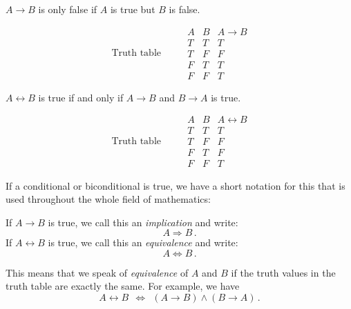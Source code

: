 

\begin{definition}
   $A \rightarrow B$ is only false if $A$ is true but $B$ is false.
\end{definition}
 
   \begin{equation}
   \mbox{ Truth table }\qquad 
    \begin{array}{cc|c}
     A & B & A \rightarrow B \\ \hline
     T & T& T\\
     T & F & F\\
     F & T & T\\
     F & F & T
    \end{array}
   \end{equation}


\begin{definition}
$A \leftrightarrow B$ is true if and only if $A \rightarrow B$ and $B \rightarrow A$ is true.
\end{definition}

   \begin{equation}
   \mbox{ Truth table }\qquad 
    \begin{array}{cc|c}
     A & B & A \leftrightarrow B \\ \hline
     T & T& T\\
     T & F & F\\
     F & T & F\\
     F & F & T
    \end{array}
   \end{equation}
   
If a conditional or biconditional is true,
we have a short notation for this that is used throughout   
the whole field of mathematics:
   
\begin{definition}
If $A \rightarrow B$ is true,
we call this an \emph{implication} and write:
	$$
	A \Rightarrow B  \,.
	$$
If $A \leftrightarrow B$ is true,
we call this an \emph{equivalence} and write:
	$$
	A \Leftrightarrow B  \,.
	$$
\end{definition}
 
This means that we speak of \emph{equivalence} of $A$ and $B$ if
the truth values in the truth table are exactly the same. For example, we have
	$$
		A \leftrightarrow B ~~ \Leftrightarrow
		~~
		(A \rightarrow B) \wedge (B \rightarrow A)
		\,.
	$$
 
